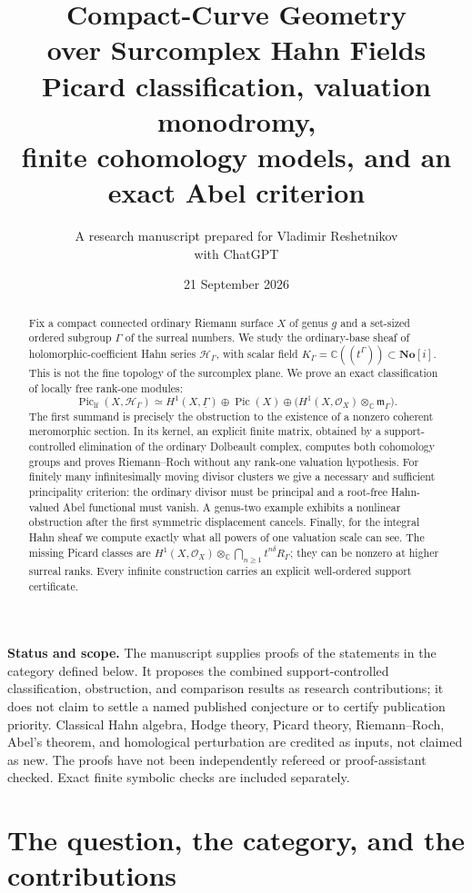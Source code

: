\documentclass[11pt,letterpaper]{article}
\title{\textbf{Compact-Curve Geometry\\over Surcomplex Hahn Fields}\\[0.65em]
\large Picard classification, valuation monodromy,\\
finite cohomology models, and an exact Abel criterion}
\author{A research manuscript prepared for Vladimir Reshetnikov\\
\small with ChatGPT}
\date{21 September 2026}
\numberwithin{equation}{section}
\theoremstyle{definition}
\theoremstyle{remark}
\newcommand{\C}{\mathbb C}
\newcommand{\No}{\mathbf{No}}
\newcommand{\HH}{\mathcal H}
\newcommand{\OO}{\mathcal O}
\newcommand{\mm}{\mathfrak m}
\newcommand{\Pic}{\operatorname{Pic}}
\newcommand{\Piclf}{\operatorname{Pic}_{\mathrm{lf}}}
\newcommand{\Hg}{\HH_\Gamma}
\newcommand{\Kg}{K_\Gamma}
\newcommand{\rg}{R_\Gamma}
\newcommand{\mg}{\mm_\Gamma}
\newcommand{\ot}{\otimes_{\C}}
\begin{document}
\maketitle
\thispagestyle{empty}
\begin{abstract}
Fix a compact connected ordinary Riemann surface $X$ of genus $g$ and a
set-sized ordered subgroup $\Gamma$ of the surreal numbers. We study the
ordinary-base sheaf of holomorphic-coefficient Hahn series
$\Hg$, with scalar field $\Kg=\C((t^\Gamma))\subset\No[i]$.
This is not the fine topology of the surcomplex plane. We prove an exact
classification of locally free rank-one modules:
\[
 \Piclf(X,\Hg)\simeq H^1(X,\underline\Gamma)\oplus\Pic(X)
       \oplus\bigl(H^1(X,\OO_X)\ot\mg\bigr).
\]
The first summand is precisely the obstruction to the existence of a
nonzero coherent meromorphic section. In its kernel, an explicit finite
matrix, obtained by a support-controlled elimination of the ordinary
Dolbeault complex, computes both cohomology groups and proves
Riemann--Roch without any rank-one valuation hypothesis.
For finitely many infinitesimally moving divisor clusters we give a
necessary and sufficient principality criterion: the ordinary divisor
must be principal and a root-free Hahn-valued Abel functional must vanish.
A genus-two example exhibits a nonlinear obstruction after the first
symmetric displacement cancels.
Finally, for the integral Hahn sheaf we compute exactly what all powers
of one valuation scale can see. The missing Picard classes are
$H^1(X,\OO_X)\ot\bigcap_{n\ge1}t^{n\delta}\rg$; they can be nonzero
at higher surreal ranks. Every infinite construction carries an explicit
well-ordered support certificate.
\end{abstract}
\vspace{0.5em}
\noindent\textbf{Status and scope.}
The manuscript supplies proofs of the statements in the category defined
below. It proposes the combined support-controlled classification,
obstruction, and comparison results as research contributions; it does
not claim to settle a named published conjecture or to certify publication
priority. Classical Hahn algebra, Hodge theory, Picard theory,
Riemann--Roch, Abel's theorem, and homological perturbation are credited
as inputs, not claimed as new. The proofs have not been independently
refereed or proof-assistant checked. Exact finite symbolic checks are
included separately.
\clearpage
\tableofcontents
\clearpage

\section{The question, the category, and the contributions}
\label{sec:intro}
\end{document}
